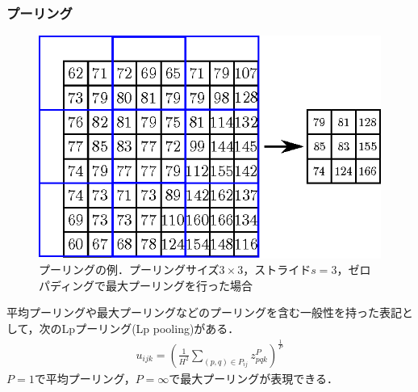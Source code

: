\documentclass[dvipdfmx,11pt,notheorems]{beamer}
\theoremstyle{definition}
\begin{document}
\begin{frame}[fragile]\frametitle{プーリング}
\begin{figure}[bt]
 \centering
 \includegraphics[scale = 0.6]{fig/eps/pooling.eps}
 \caption{プーリングの例．プーリングサイズ$3\times 3$，ストライド$s=3$，ゼロパディングで最大プーリングを行った場合}
\end{figure}
平均プーリングや最大プーリングなどのプーリングを含む一般性を持った表記として，次のLpプーリング(Lp pooling)がある．
\begin{eqnarray}
 u_{ijk} = \left(\frac{1}{H^{2}}\sum_{(p,q) \in P_{ij}}z^{P}_{pqk}\right)^{\frac{1}{P}}
\end{eqnarray}
$P=1$で平均プーリング，$P=\infty$で最大プーリングが表現できる．

\end{frame}




\end{document}
